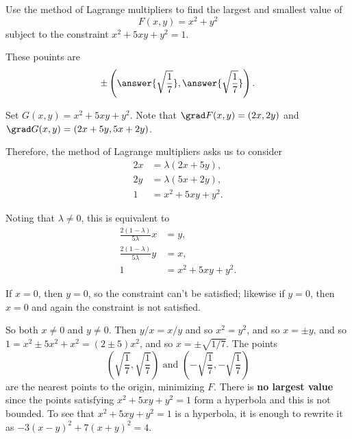 \documentclass{ximera}
\author{Jim Fowler}
\begin{document}
\begin{exercise}
  Use the method of Lagrange multipliers to find the largest and
  smallest value of
  $$
  F(x,y) = x^2 + y^2
  $$
  subject to the constraint $x^2 + 5 xy + y^2 = 1$.

  These pouints are
  \[
    \pm \left( \answer{\sqrt{\frac{1}{7}}}, \answer{\sqrt{\frac{1}{7}}} \right).
  \]
  
  \begin{hint}
Set $G(x,y) = x^2 + 5xy + y^2$.  Note that $\grad F(x,y) = (2x,2y)$ and $\grad G(x,y) = (2x + 5y, 5x + 2y)$.
\end{hint}

  \begin{hint}
Therefore, the method of Lagrange multipliers asks us to consider
\begin{align*}
  2x &= \lambda( 2x + 5y ), \\
  2y &= \lambda( 5x + 2y ), \\
  1 &= x^2 + 5xy + y^2.
\end{align*}
\end{hint}

\begin{hint}
Noting that $\lambda \neq 0$, this is equivalent to
\begin{align*}
  \frac{2 (1 - \lambda)}{5 \lambda} x &= y, \\
  \frac{2 (1 - \lambda)}{5 \lambda} y &= x, \\
  1 &= x^2 + 5xy + y^2.
\end{align*}
\end{hint}

\begin{hint}
  If $x = 0$, then $y = 0$, so the constraint can't be satisfied; likewise if $y = 0$, then $x = 0$ and again the constraint is not satisfied.
\end{hint}

\begin{hint}
  So both $x \neq 0$ and $y \neq 0$.   Then $y/x = x/y$ and so $x^2 = y^2$, and so $x = \pm y$, and so $1 = x^2 \pm 5x^2 + x^2 = (2 \pm 5) x^2$, and so $x = \pm \sqrt{1/7}$.  The points
$$
\left( \sqrt{\frac{1}{7}}, \sqrt{\frac{1}{7}} \right) \mbox{ and } \left( -\sqrt{\frac{1}{7}}, -\sqrt{\frac{1}{7}} \right)
$$
are the nearest points to the origin, minimizing $F$.  There is \textbf{no largest value} since the points satisfying $x^2 + 5 xy + y^2 = 1$ form a hyperbola and this is not bounded.  To see that $x^2 + 5xy + y^2 = 1$ is a hyperbola, it is enough to rewrite it as $-3 (x-y)^2 + 7 (x+y)^2 = 4$.
\end{hint}


\end{exercise}
\end{document}
